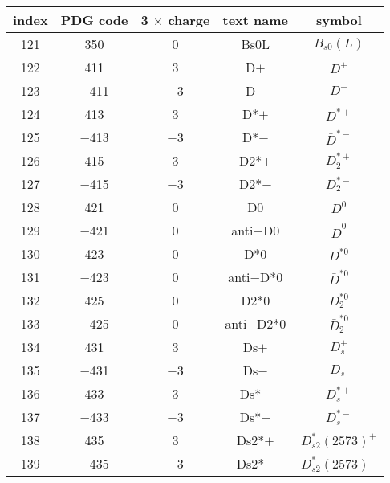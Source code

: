 \documentclass{article}
\begin{document}
\begin{table}[!htbp]
\centering
\begin{tabular}{|c|c|c|c|c|}
\hline
index & PDG code & 3 $\times$ charge & text name & symbol \\
\hline
121 & 350 & 0 & B\underline{\hspace{0.6em}}s0L & $B_{s0}(L)$ \\
\hline
122 & 411 & 3 & D$+$ & $D^{+}$ \\
\hline
123 & $-$411 & $-$3 & D$-$ & $D^{-}$ \\
\hline
124 & 413 & 3 & D*$+$ & $D^{*+}$ \\
\hline
125 & $-$413 & $-$3 & D*$-$ & $\bar{D}^{*-}$ \\
\hline
126 & 415 & 3 & D\underline{\hspace{0.6em}}2*$+$ & $D_{2}^{*+}$ \\
\hline
127 & $-$415 & $-$3 & D\underline{\hspace{0.6em}}2*$-$ & $D_{2}^{*-}$ \\
\hline
128 & 421 & 0 & D0 & $D^{0}$ \\
\hline
129 & $-$421 & 0 & anti$-$D0 & $\bar{D}^{0}$ \\
\hline
130 & 423 & 0 & D*0 & $D^{*0}$ \\
\hline
131 & $-$423 & 0 & anti$-$D*0 & $\bar{D}^{*0}$ \\
\hline
132 & 425 & 0 & D\underline{\hspace{0.6em}}2*0 & $D_{2}^{*0}$ \\
\hline
133 & $-$425 & 0 & anti$-$D\underline{\hspace{0.6em}}2*0 & $\bar{D}_{2}^{*0}$ \\
\hline
134 & 431 & 3 & D\underline{\hspace{0.6em}}s$+$ & $D_{s}^{+}$ \\
\hline
135 & $-$431 & $-$3 & D\underline{\hspace{0.6em}}s$-$ & $D_{s}^{-}$ \\
\hline
136 & 433 & 3 & D\underline{\hspace{0.6em}}s*$+$ & $D_{s}^{*+}$ \\
\hline
137 & $-$433 & $-$3 & D\underline{\hspace{0.6em}}s*$-$ & $D_{s}^{*-}$ \\
\hline
138 & 435 & 3 & D\underline{\hspace{0.6em}}s2*$+$ & $D_{s2}^{*}(2573)^{+}$ \\
\hline
139 & $-$435 & $-$3 & D\underline{\hspace{0.6em}}s2*$-$ & $D_{s2}^{*}(2573)^{-}$ \\

\end{tabular}
\end{table}
\end{document}
